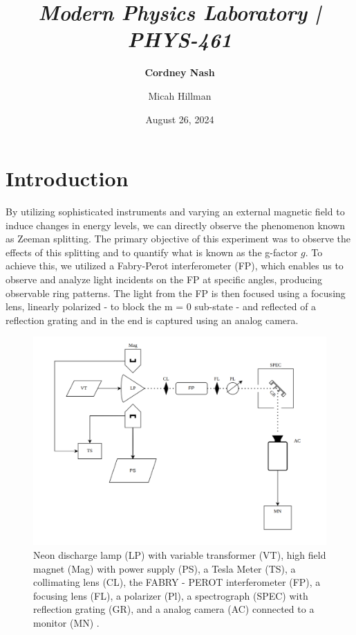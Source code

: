 \documentclass[a4paper,12pt,english]{all-in-one} %
\title{{\large\textit{Modern Physics Laboratory | PHYS-461}}\\[0.5cm]{\Huge\color{gray}\textsc{\@docsubtitle}}}
\author{\textbf{Cordney Nash} \and Micah Hillman }
\date{August 26, 2024}
\begin{document}
\begin{titlepage}
\maketitle\vfill
\end{titlepage}
\newpage


\section*{Introduction}
{
By utilizing sophisticated instruments and varying an external magnetic field to induce changes in energy levels, we can directly observe the phenomenon known as Zeeman splitting. The primary objective of this experiment was to observe the effects of this splitting and to quantify what is known as the g-factor $g$. To achieve this, we utilized a Fabry-Perot interferometer (FP), which enables us to observe and analyze light incidents on the FP at specific angles, producing observable ring patterns. The light from the FP is then focused using a focusing lens, linearly polarized - to block the m = 0 sub-state - and reflected of a reflection grating and in the end is captured using an analog camera.

}

\begin{center}
\begin{figure}[h!]
    \centering
    \includegraphics[width=0.9\linewidth]{1-zeeman_splitting/overleaf/images/Screenshot_20240913_094536.png}
    \caption{ \scriptsize{Neon discharge lamp (LP) with variable transformer (VT), high field magnet (Mag) with power supply (PS), a Tesla Meter (TS), a collimating lens (CL), the FABRY - PEROT interferometer (FP), a focusing lens (FL), a polarizer (Pl), a spectrograph (SPEC) with reflection grating (GR), and a analog camera (AC) connected to a monitor (MN) .} }
    \label{fig:enter-label}
\end{figure}

\end{center}
\end{document}
